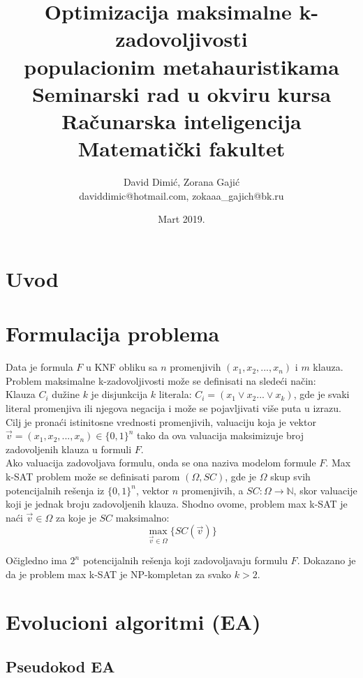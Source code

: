 \documentclass{article}
\title{Optimizacija maksimalne k-zadovoljivosti\\ populacionim metahauristikama\\ \small{Seminarski rad u okviru kursa\\ Računarska inteligencija\\ Matematički fakultet}}
\author{David Dimić, Zorana Gajić \\ daviddimic@hotmail.com, zokaaa\_gajich@bk.ru}
\date{Mart 2019.}
\begin{document}
\maketitle  
\tableofcontents
\newpage

\abstract{
}

\section{Uvod}

\section{Formulacija problema}
Data je formula $F$ u KNF obliku sa $n$ promenjivih $(x_1, x_2, ..., x_n)$ i $m$ klauza. Problem maksimalne k-zadovoljivosti može se definisati na sledeći način:\\ 

Klauza $C_i$ dužine $k$ je disjunkcija $k$ literala: 
$C_i = (x_1  \vee x_2 ... \vee x_k)$, gde je svaki literal promenjiva ili njegova negacija i može se pojavljivati više puta u izrazu.
Cilj je pronaći istinitosne vrednosti promenjivih, valuaciju koja je vektor $\vec{v} = (x_1, x_2, ..., x_n) \in \{ 0,1 \}^n$ tako da ova valuacija maksimizuje broj zadovoljenih klauza u formuli $F$.\\

Ako valuacija zadovoljava formulu, onda se ona naziva modelom formule $F$. Max k-SAT problem može se definisati parom $(\Omega, SC)$, gde je $\Omega$ skup svih potencijalnih rešenja iz $\{0,1\}^n$, vektor $n$ promenjivih, a $SC:\Omega \rightarrow \mathbb{N}$, skor valuacije koji je jednak broju zadovoljenih klauza. Shodno ovome, problem max k-SAT je naći $\vec{v} \in \Omega$ za koje je $SC$ maksimalno:\\
$$\max_{\vec{v} \in \Omega}\{SC(\vec{v})\}$$

Očigledno ima $2^n$ potencijalnih rešenja koji zadovoljavaju formulu $F$. Dokazano je da je problem max k-SAT je NP-kompletan za svako $k>2$. %


\section{Evolucioni algoritmi (EA)}

\subsection{Pseudokod EA}
\end{document}
